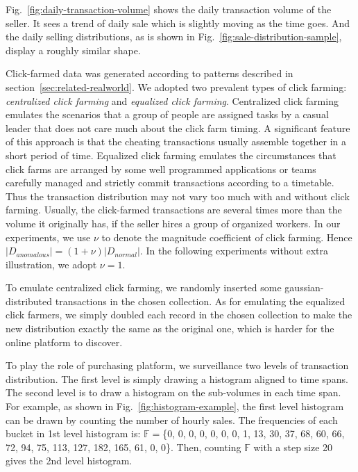 \documentclass[10pt,conference,letterpaper]{IEEEtran}
\begin{document}
			Fig.~\ref{fig:daily-transaction-volume} shows the daily transaction volume of the seller. It sees a trend of daily sale which is slightly moving as the time goes. And the daily selling distributions, as is shown in Fig.~\ref{fig:sale-distribution-sample}, display a roughly similar shape.
			
			Click-farmed data was generated according to patterns described in section~\ref{sec:related-realworld}. We adopted two prevalent types of click farming: \textit{centralized click farming} and \textit{equalized click farming}. Centralized click farming emulates the scenarios that a group of people are assigned tasks by a casual leader that does not care much about the click farm timing. A significant feature of this approach is that the cheating transactions usually assemble together in a short period of time. Equalized click farming emulates the circumstances that click farms are arranged by some well programmed applications or teams carefully managed and strictly commit transactions according to a timetable. Thus the transaction distribution may not vary too much with and without click farming. 
			Usually, the click-farmed transactions are several times more than the volume it originally has, if the seller hires a group of organized workers. In our experiments, we use $\nu$ to denote the magnitude coefficient of click farming. Hence $|D_{anomalous}| = (1 + \nu)|D_{normal}|$. In the following experiments without extra illustration, we adopt $\nu = 1$.
	
			To emulate centralized click farming, we randomly inserted some gaussian-distributed transactions in the chosen collection. As for emulating the equalized click farmers, we simply doubled each record in the chosen collection to make the new distribution exactly the same as the original one, which is harder for the online platform to discover.
			
			To play the role of purchasing platform, we surveillance two levels of transaction distribution. The first level is simply drawing a histogram aligned to time spans. The second level is to draw a histogram on the sub-volumes in each time span. For example, as shown in Fig.~\ref{fig:histogram-example}, the first level histogram can be drawn by counting the number of hourly sales. The frequencies of each bucket in 1st level histogram is: $\mathbb{F}=$\{0, 0, 0, 0, 0, 0, 0, 1, 13, 30, 37, 68, 60, 66, 72, 94, 75, 113, 127, 182, 165, 61, 0, 0\}. Then, counting $\mathbb{F}$ with a step size 20 gives the 2nd level histogram.
	
\end{document}
